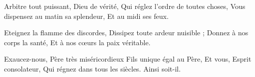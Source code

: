 Arbitre tout puissant, Dieu de vérité,
Qui réglez l'ordre de toutes choses,
Vous dispensez au matin sa splendeur,
Et au midi ses feux.

Eteignez la flamme des discordes,
Dissipez toute ardeur nuisible ;
Donnez à nos corps la santé,
Et à nos cœurs la paix véritable.

Exaucez-nous, Père très miséricordieux
Fils unique égal au Père,
Et vous, Esprit consolateur,
Qui régnez dans tous les siècles.
Ainsi soit-il.